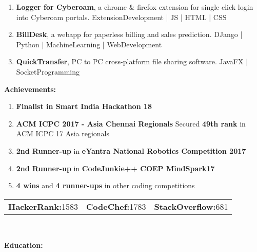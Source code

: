 \documentclass[a4paper,11pt]{article}
\begin{document}
\begin{center}
\begin{minipage}[t]{0.6\textwidth}
\begin{LARGE}
{\begin{enumerate}
						JavaScript | Crons | PushDownAutomata
						\item \textbf{Logger for Cyberoam}, a chrome \& firefox extension for single click login into Cyberoam portals.\linebreak
						ExtensionDevelopment | JS | HTML | CSS
						\item \textbf{BillDesk}, a webapp for paperless billing and sales prediction.\linebreak
						DJango | Python | MachineLearning | WebDevelopment
						\item \textbf{QuickTransfer}, PC to PC cross-platform file sharing software.\linebreak
						JavaFX | SocketProgramming
					\end{enumerate}
				}
			\end{LARGE}
			\vspace{0.65cm}
            \begin{LARGE}
				\textbf{Achievements:}\medskip%
				{\small
					\begin{enumerate}
						\item \textbf{Finalist in Smart India Hackathon 18}
						\item \textbf{ACM ICPC 2017 - Asia Chennai Regionals}\linebreak
						Secured \textbf{49th rank} in ACM ICPC 17 Asia regionals
						\item \textbf{2nd Runner-up} in \textbf{eYantra National Robotics Competition 2017}
						\item \textbf{2nd Runner-up} in \textbf{CodeJunkie++ COEP MindSpark17}
						\item \textbf{4 wins} and \textbf{4 runner-ups} in other coding competitions
					\end{enumerate}
				}
			\end{LARGE}
			\vspace{0.35cm}
			\begin{normalsize}
				\begin{tabu} to \textwidth {X[l]X[c]X[r]}
					\textbf{HackerRank:}1583 & \textbf{CodeChef:}1783 & \textbf{StackOverflow:}681
				\end{tabu}
			\end{normalsize}
			\\
			\vspace{0.7cm}
            \begin{LARGE}
				\textbf{Education:}
				\medskip\linebreak%
				\begin{tabu} to \textwidth {X[1.15l]X[6l]}

\end{tabu}
\end{LARGE}
\end{minipage}
\end{center}
\end{document}
